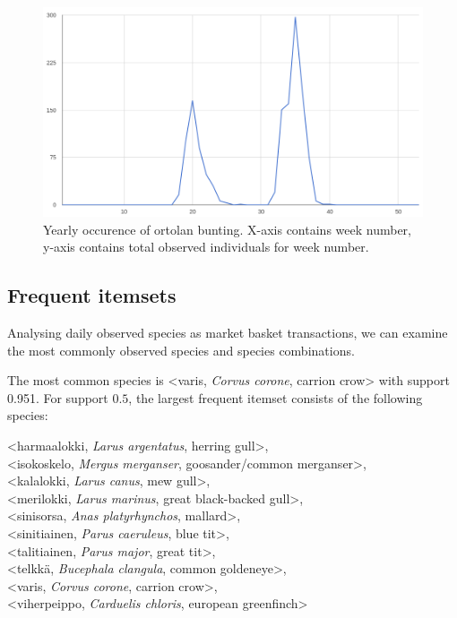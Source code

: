 \documentclass[english]{tktltiki2}
\begin{document}

\begin{figure}[htb]
\centering
\includegraphics[clip=true, width=\textwidth]{embhor_weeks}
\caption{Yearly occurence of ortolan bunting. X-axis contains week number, y-axis contains total observed individuals for week number.}
\label{fig: embhor_weeks}
\end{figure}





\subsection{Frequent itemsets}

Analysing daily observed species as market basket transactions, we can examine the most commonly observed species and species combinations.

The most common species is <varis, \emph{Corvus corone}, carrion crow> with support 0.951. For support $0.5$, the largest frequent itemset consists of the following species:

\hangindent=0.7cm
<harmaalokki, \emph{Larus argentatus}, herring gull>, \\
<isokoskelo, \emph{Mergus merganser}, goosander/common merganser>, \\
<kalalokki, \emph{Larus canus}, mew gull>, \\
<merilokki, \emph{Larus marinus}, great black-backed gull>, \\
<sinisorsa, \emph{Anas platyrhynchos}, mallard>, \\
<sinitiainen, \emph{Parus caeruleus}, blue tit>, \\
<talitiainen, \emph{Parus major}, great tit>, \\
<telkkä, \emph{Bucephala clangula}, common goldeneye>, \\
<varis, \emph{Corvus corone}, carrion crow>, \\
<viherpeippo, \emph{Carduelis chloris}, european greenfinch> \\
\end{document}
